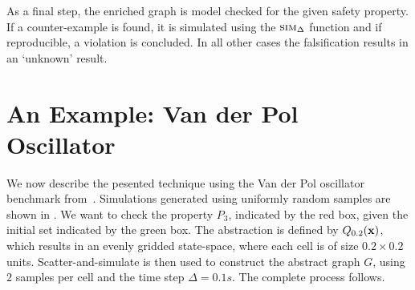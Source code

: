 
As a final step, the enriched graph is model checked for the given
safety property. If a counter-example is found, it is simulated using
the $\mbox{\sc sim}_\Delta$ function and if reproducible, a violation is
concluded. In all other cases the falsification results in an
`unknown' result.


\section{An Example: Van der Pol Oscillator}

We now describe the pesented technique using the Van der Pol
oscillator benchmark from~\cite{zutshi2014multiple}. Simulations
generated using uniformly random samples are shown in
. We want to check the property $P_3$, indicated by
the red box, given the initial set indicated by the green box. The
abstraction is defined by $Q_{0.2}(\mathbf{x})$, which results in an
evenly gridded state-space, where each cell is of size $0.2 \times
0.2$ units.  Scatter-and-simulate is then used to construct the
abstract graph $G$, using $2$ samples per cell and the time step
$\Delta = 0.1s$. The complete process follows.

